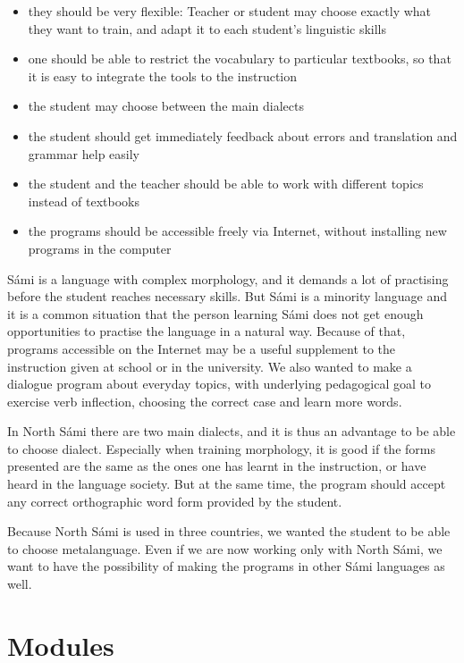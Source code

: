 \documentclass[11pt]{article}
\begin{document}
\begin{itemize}
\item they should be very flexible: Teacher or student may choose exactly what they want to train, and adapt it to each student's linguistic skills 
\item one should be able to restrict the vocabulary to particular textbooks, so that it is easy to integrate the tools to the instruction
\item the student may choose between the main dialects 
\item the student should get immediately feedback about errors and translation and grammar help easily
\item the student and the teacher should be able to work with different topics instead of textbooks
\item the programs should be accessible freely via Internet, without installing new programs in the computer
\end{itemize}

Sámi is a language with complex morphology, and it demands a lot of practising before the student reaches necessary skills. But Sámi is a minority language and it is a common situation that the person learning Sámi does not get enough opportunities to practise the language in a natural way. Because of that, programs accessible on the Internet may be a useful supplement to the instruction given at school or in the university. We also wanted to make a dialogue program about everyday topics, with underlying pedagogical goal to exercise verb inflection, choosing the correct case and learn more words. 

In North Sámi there are two main dialects, and it is thus an advantage to be able to choose dialect. Especially when training morphology, it is good if the forms presented are the same as the ones one has learnt in the instruction, or have heard in the language society. But at the same time, the program should accept any correct orthographic word form provided by the student.

Because North Sámi is used in three countries, we wanted the student to be able to choose metalanguage. Even if we are now working only with North Sámi, we want to have the possibility of making the programs in other Sámi languages as well.



\section{Modules}
\end{document}
